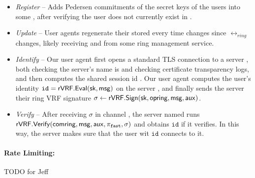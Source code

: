 \begin{itemize}
	\item {\em Register} --
	Adds Pedersen commitments of the secret keys of the users into some \ring,
	after verifying the user does not currently exist in \ring.
	\item {\em Update} --
	User agents regenerate their stored  \pifast every time \ring changes since $ \rel_{ring} $ changes,
	likely receiving \comring and \openring from some ring management service.  
	\item {\em Identify} --
	Our user agent first opens a standard TLS connection to a server \msg,
	both checking the server's name is \msg and checking certificate
	transparency logs, and then computes the shared session id \aux.
	Our user agent computes the user's identity
	$\mathtt{id} = {\mathsf{rVRF}}.{\mathsf{Eval}}(\mathsf{sk},\mathsf{msg})$ on the server \msg,
	and finally sends the server their ring VRF signature
	$\sigma \leftarrow {\ensuremath{\mathsf{rVRF}}}.{\mathsf{Sign}}(\mathsf{sk},\mathsf{opring},\mathsf{msg},\mathsf{aux})$. %
	\item {\em Verify} -- 
	After receiving $\sigma$ in channel \aux,
	the server named \msg runs $ {\mathsf{rVRF}}.{\mathsf{Verify}}(\mathsf{comring},\mathsf{msg},\mathsf{aux}, \pi_{\mathtt{fast}},\sigma) $ and obtains $ \mathtt{id} $ if it verifies. In this way, the server makes sure that the user wit $ \mathtt{id} $ connects to it.
\end{itemize}

\paragraph{Rate Limiting:}
TODO for Jeff
